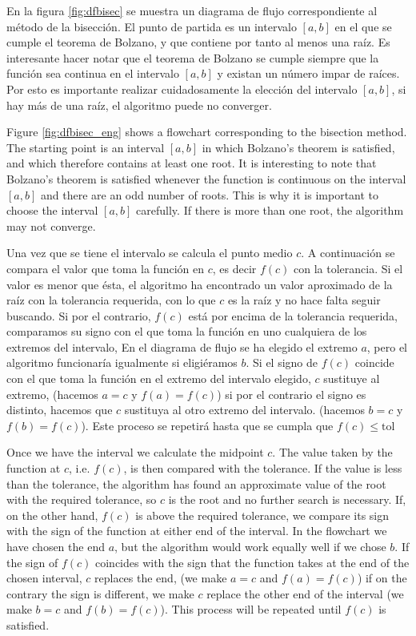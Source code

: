\begin{paracol}{2}

En la figura \ref{fig:dfbisec} se muestra un diagrama de flujo correspondiente al método de la bisección. El punto de partida es un intervalo $[a,b]$ en el que se cumple el teorema de Bolzano, y que contiene por tanto al menos una raíz. Es interesante hacer notar que el teorema de Bolzano se cumple siempre que la función sea continua en el intervalo $[a,b]$ y existan un número impar de raíces. Por esto es importante realizar cuidadosamente la elección del intervalo $[a,b]$, si hay más de una raíz, el algoritmo puede no converger.

\switchcolumn

Figure \ref{fig:dfbisec_eng} shows a flowchart corresponding to the bisection method. The starting point is an interval $[a,b]$ in which Bolzano's theorem is satisfied, and which therefore contains at least one root. It is interesting to note that Bolzano's theorem is satisfied whenever the function is continuous on the interval $[a,b]$ and there are an odd number of roots. This is why it is important to choose the interval $[a,b]$ carefully. If there is more than one root, the algorithm may not converge.

\switchcolumn
 Una vez que se tiene el intervalo se calcula el punto medio $c$. A continuación se compara el valor que toma la función en $c$, es decir $f(c)$ con la tolerancia. Si el valor es menor que ésta, el algoritmo ha encontrado un valor aproximado de la raíz con la tolerancia requerida, con lo que $c$ es la raíz y no hace falta seguir buscando. Si por el contrario, $f(c)$ está por encima de la tolerancia requerida, comparamos su signo con el que toma la función en uno cualquiera de los extremos del intervalo, En el diagrama de flujo se ha elegido el extremo $a$, pero el algoritmo funcionaría igualmente si eligiéramos $b$. Si el signo de $f(c)$ coincide con el que toma la función en el extremo del intervalo elegido, $c$ sustituye al extremo, (hacemos $a=c$ y $f(a)=f(c)$) si por el contrario el signo es distinto, hacemos que $c$ sustituya al otro extremo del intervalo. (hacemos $b=c$ y $f(b)=f(c)$). Este proceso se repetirá hasta que se cumpla que $f(c)\le \text{tol}$ 

\switchcolumn

 Once we have the interval we calculate the midpoint $c$. The value taken by the function at $c$, i.e. $f(c)$, is then compared with the tolerance. If the value is less than the tolerance, the algorithm has found an approximate value of the root with the required tolerance, so $c$ is the root and no further search is necessary. If, on the other hand, $f(c)$ is above the required tolerance, we compare its sign with the sign of the function at either end of the interval. In the flowchart we have chosen the end $a$, but the algorithm would work equally well if we chose $b$. If the sign of $f(c)$ coincides with the sign that the function takes at the end of the chosen interval, $c$ replaces the end, (we make $a=c$ and $f(a)=f(c)$) if on the contrary the sign is different, we make $c$ replace the other end of the interval (we make $b=c$ and $f(b)=f(c)$). This process will be repeated until $f(c)$ is satisfied. 



\end{paracol}
